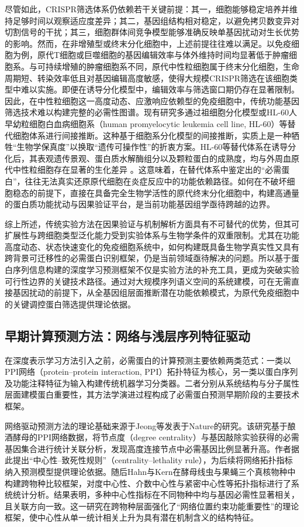 尽管如此，CRISPR筛选体系仍依赖若干关键前提：其一，细胞能够稳定培养并维持足够时间以观察适应度差异；其二，基因组结构相对稳定，以避免拷贝数变异对切割信号的干扰；其三，细胞群体间竞争模型能够准确反映单基因扰动对生长优势的影响。然而，在非增殖型或终末分化细胞中，上述前提往往难以满足。以免疫细胞为例，原代T细胞或巨噬细胞的基因编辑效率与体外维持时间均显著低于肿瘤细胞系\cite{shifrut2018genome}。与可持续增殖的肿瘤细胞系不同，原代中性粒细胞属于终末分化细胞，生命周期短、转染效率低且对基因编辑高度敏感，使得大规模CRISPR筛选在该细胞类型中难以实施。即便在诱导分化模型中，编辑效率与筛选窗口期仍存在显著限制。因此，在中性粒细胞这一高度动态、应激响应依赖型的免疫细胞中，传统功能基因筛选技术难以构建完整的必需性图谱。现有研究多通过祖细胞分化模型或HL-60人早幼粒细胞白血病细胞系（human promyelocytic leukemia cell line, HL-60）等替代细胞体系进行间接推断\cite{nasri2020crispr}。这种基于细胞系分化模型的间接推断，实质上是一种牺牲“生物学保真度”以换取“遗传可操作性”的折衷方案。HL-60等替代体系在诱导分化后，其表观遗传景观、蛋白质水解酶组分以及颗粒蛋白的成熟度，均与外周血原代中性粒细胞存在显著的生化差异 \cite{allen2023closing}。这意味着，在替代体系中鉴定出的“必需蛋白”，往往无法真实还原原代细胞在炎症反应中的功能依赖路径。如何在不破坏细胞稳态的前提下，直接在具备完全生物学活性的原代终末分化细胞中，构建高通量的蛋白质功能扰动与因果验证平台，是当前功能基因组学亟待跨越的边界。

综上所述，传统实验方法在因果验证与机制解析方面具有不可替代的优势，但其可扩展性与跨细胞类型泛化能力受到实验体系与生物学条件的双重限制。尤其在功能高度动态、状态快速变化的免疫细胞系统中，如何构建既具备生物学真实性又具有跨背景可迁移性的必需蛋白识别框架，仍是当前领域亟待解决的问题。所以基于蛋白序列信息构建的深度学习预测框架不仅是实验方法的补充工具，更成为突破实验可行性边界的关键技术路径。通过对大规模序列语义空间的系统建模，可在无需直接基因扰动的前提下，从全基因组层面推断潜在功能依赖模式，为原代免疫细胞中的关键调控蛋白筛选提供理论依据。

\subsection{早期计算预测方法：网络与浅层序列特征驱动}

在深度表示学习方法引入之前，必需蛋白的计算预测主要依赖两类范式：一类以PPI网络（protein--protein interaction, PPI）拓扑特征为核心，另一类以蛋白序列及功能注释特征为输入构建传统机器学习分类器。二者分别从系统结构与分子属性层面建模蛋白重要性，其方法学演进过程构成了必需蛋白预测早期阶段的主要技术框架。

网络驱动预测方法的理论基础来源于Jeong等发表于Nature的研究\cite{jeong2001lethality}。该研究基于酿酒酵母的PPI网络数据，将节点度（degree centrality）与基因敲除实验获得的必需基因集合进行统计关联分析，发现高度连接节点中必需基因比例显著升高。作者据此提出“中心性–致死性规则”（centrality–lethality rule），为后续将网络拓扑指标纳入预测模型提供理论依据。随后Hahn与Kern\cite{hahn2005comparative}在酵母线虫与果蝇三个真核物种中构建跨物种比较框架，对度中心性、介数中心性与紧密中心性等拓扑指标进行了系统统计分析。结果表明，多种中心性指标在不同物种中均与基因必需性显著相关，且关联方向一致。这一研究在跨物种层面强化了“网络位置约束功能重要性”的理论框架，使中心性从单一统计相关上升为具有潜在机制含义的结构特征。

